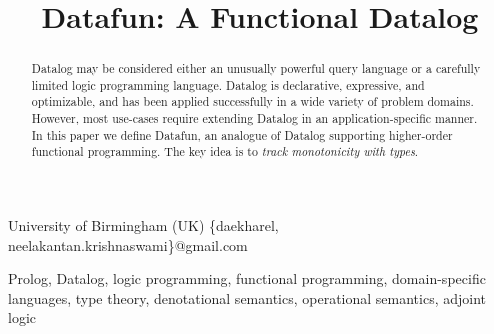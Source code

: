 \documentclass{sigplanconf}
\begin{document}
\toappear{}
\setlength{\pdfpageheight}{\paperheight}
\setlength{\pdfpagewidth}{\paperwidth}





\title{Datafun: A Functional Datalog}
\subtitle{}

           {University of Birmingham (UK)}
           {\{daekharel, neelakantan.krishnaswami\}@gmail.com}

\maketitle


\begin{abstract}
  Datalog may be considered either an unusually powerful query language or a
  carefully limited logic programming language. Datalog is declarative,
  expressive, and optimizable, and has been applied successfully in a wide
  variety of problem domains. However, most use-cases require extending Datalog
  in an application-specific manner. In this paper we define Datafun, an
  analogue of Datalog supporting higher-order functional programming. The key
  idea is to \emph{track monotonicity with types}.
\end{abstract}

%
%
\keywords Prolog, Datalog, logic programming, functional programming, domain-specific languages,
type theory, denotational semantics, operational semantics, adjoint
logic





\end{document}
